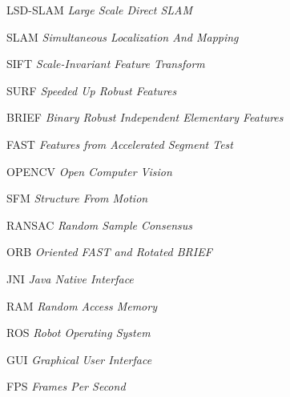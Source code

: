
\begin{siglas}
\item[LSD-SLAM]\textit{Large Scale Direct SLAM} 
\item[SLAM]\textit{Simultaneous Localization And Mapping}
\item[SIFT]\textit{Scale-Invariant Feature Transform}
\item[SURF]\textit{Speeded Up Robust Features}
\item[BRIEF]\textit{Binary Robust Independent Elementary Features}
\item[FAST]\textit{Features from Accelerated Segment Test}
\item[OPENCV]\textit{Open Computer Vision}
\item[SFM]\textit{Structure From Motion}
\item[RANSAC]\textit{Random Sample Consensus}
\item[ORB]\textit{Oriented FAST and Rotated BRIEF}
\item[JNI]\textit{Java Native Interface}
\item[RAM]\textit{Random Access Memory}
\item[ROS]\textit{Robot Operating System}
\item[GUI]\textit{Graphical User Interface}
\item[FPS]\textit{Frames Per Second}

\end{siglas}
